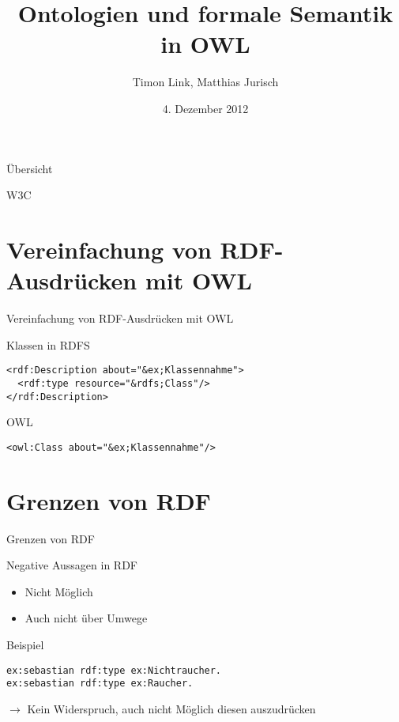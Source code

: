 \documentclass{beamer}
\title[OWL]{Ontologien und formale Semantik in OWL}
\author{Timon Link, Matthias Jurisch}
\date{4. Dezember 2012}
\begin{document}
\begin{frame}
\titlepage
\end{frame}

\begin{frame}{Übersicht}
\tableofcontents
\end{frame}

\begin{frame}{W3C}
\end{frame}


\section{Vereinfachung von RDF-Ausdrücken mit OWL}
\begin{frame}[fragile]{Vereinfachung von RDF-Ausdrücken mit
OWL}
\begin{block}{Klassen in RDFS}
\begin{lstlisting}[lang="xml"]
<rdf:Description about="&ex;Klassennahme">
  <rdf:type resource="&rdfs;Class"/>
</rdf:Description>
\end{lstlisting}
\end{block}
\begin{block}{OWL}
\begin{lstlisting}[lang="xml"]
<owl:Class about="&ex;Klassennahme"/>
\end{lstlisting}
\end{block}

\end{frame}


\section{Grenzen von RDF}

\begin{frame}[fragile]{Grenzen von RDF}
\begin{block}{Negative Aussagen in RDF}
\begin{itemize}
\item Nicht Möglich
\item Auch nicht über Umwege
\end{itemize}
\end{block}
\begin{exampleblock}{Beispiel}
\begin{lstlisting}
ex:sebastian rdf:type ex:Nichtraucher.
ex:sebastian rdf:type ex:Raucher.
\end{lstlisting}
$\rightarrow$ Kein Widerspruch, auch nicht Möglich diesen auszudrücken
\end{exampleblock}
\end{frame}
\end{document}
